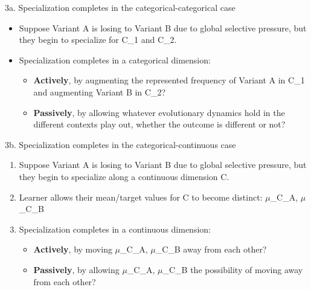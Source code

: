 \documentclass[hyperref={pdfpagelabels=false}]{beamer}
\begin{document}
\begin{frame}{3a. Specialization completes in the categorical-categorical case}
		\begin{itemize}
			\item Suppose Variant A is losing to Variant B due to global selective pressure, but they begin to specialize for C_1 and C_2.
			\item Specialization completes in a categorical dimension:
			\begin{itemize}
				\item \textbf{Actively}, by augmenting the represented frequency of Variant A in C_1 and augmenting Variant B in C_2?
				\item \textbf{Passively}, by allowing whatever evolutionary dynamics hold in the different contexts play out, whether the outcome is different or not?
			\end{itemize}
		\end{itemize}
\end{frame}

\begin{frame}{3b. Specialization completes in the categorical-continuous case}
		\begin{enumerate}
			\item Suppose Variant A is losing to Variant B due to global selective pressure, but they begin to specialize along a continuous dimension C.
			\item Learner allows their mean/target values for C to become distinct: $\mu$_{C_A},  $\mu$_{C_B}
			\item Specialization completes in a continuous dimension:
			\begin{itemize}
				\item \textbf{Actively}, by moving $\mu$_{C_A},  $\mu$_{C_B} away from each other?
				\item \textbf{Passively}, by allowing $\mu$_{C_A},  $\mu$_{C_B} the possibility of moving away from each other?
			\end{itemize}
		\end{enumerate}
\end{frame}
\end{document}
